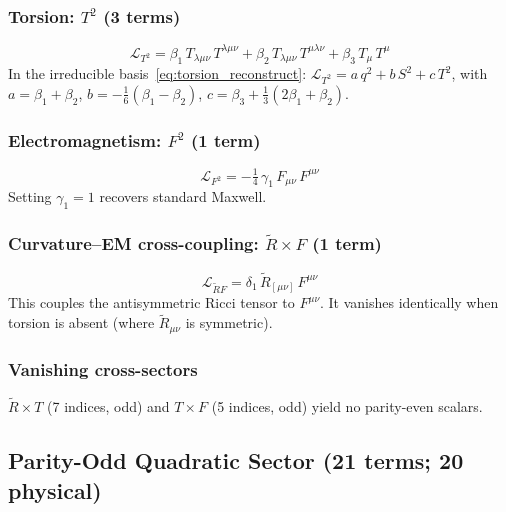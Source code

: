 \documentclass[12pt,a4paper]{article}
\newcommand{\Rt}{\tilde{R}}         %
\begin{document}
\subsubsection{Torsion: $T^2$ (3 terms)}

\begin{equation}
\boxed{
  \mathcal{L}_{T^2}
  = \beta_1\, T_{\lambda\mu\nu}\, T^{\lambda\mu\nu}
  + \beta_2\, T_{\lambda\mu\nu}\, T^{\mu\lambda\nu}
  + \beta_3\, T_\mu\, T^\mu
}
  \label{eq:torsion_squared}
\end{equation}
In the irreducible basis~\eqref{eq:torsion_reconstruct}:
$\mathcal{L}_{T^2}
= a\, q^2 + b\, S^2 + c\, T^2$, with
$a = \beta_1 + \beta_2$,\;
$b = -\frac{1}{6}(\beta_1 - \beta_2)$,\;
$c = \beta_3 + \frac{1}{3}(2\beta_1 + \beta_2)$.

\subsubsection{Electromagnetism: $F^2$ (1 term)}

\begin{equation}
\boxed{
  \mathcal{L}_{F^2} = -\tfrac{1}{4}\, \gamma_1\, F_{\mu\nu}\, F^{\mu\nu}
}
  \label{eq:em_squared}
\end{equation}
Setting $\gamma_1 = 1$ recovers standard Maxwell.

\subsubsection{Curvature--EM cross-coupling: $\Rt \times F$ (1 term)}

\begin{equation}
\boxed{
  \mathcal{L}_{\Rt F}
  = \delta_1\, \Rt_{[\mu\nu]}\, F^{\mu\nu}
}
  \label{eq:curv_em}
\end{equation}
This couples the antisymmetric Ricci tensor to $F^{\mu\nu}$.
It vanishes identically when torsion is absent (where $\Rt_{\mu\nu}$
is symmetric).

\subsubsection{Vanishing cross-sectors}

$\Rt \times T$ (7 indices, odd) and $T \times F$ (5 indices, odd)
yield no parity-even scalars.


\subsection{Parity-Odd Quadratic Sector (21 terms; 20 physical)}
\label{sec:odd}
\end{document}
